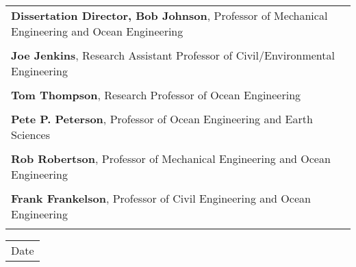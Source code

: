 \documentclass[12pt]{unhthesis}
\begin{document}
\vspace{12mm}
\begin{flushright}

\begin{singlespace}
\tabletail
   {\hline {}\\}
\tablelasttail{}
\begin{supertabular}{p{13cm}}
      \hline
         \textbf{Dissertation Director, Bob Johnson},
         \small{Professor of Mechanical Engineering and Ocean Engineering} \\
         \vspace{5mm} \\
      \hline
         \textbf{Joe Jenkins},
         \small{Research Assistant Professor of Civil/Environmental Engineering}
         \\
         \vspace{5mm}\\
      \hline
         \textbf{Tom Thompson},
         \small{Research Professor of Ocean Engineering} \\
         \vspace{5mm}\\
      \hline
         \textbf{Pete P. Peterson},
         \small{Professor of Ocean Engineering and Earth Sciences} \\
         \vspace{5mm}\\
      \hline
         \textbf{Rob Robertson},
         \small{Professor of Mechanical Engineering and Ocean Engineering} \\
         \vspace{5mm}\\
      \hline
         \textbf{Frank Frankelson},
         \small{Professor of Civil Engineering and Ocean Engineering} \\
         \vspace{12mm}\\
    \end{supertabular}

    \begin{tabular*}{2in}{l}
      \hline
        Date
    \end{tabular*}

\vspace{12mm}

\end{singlespace}
\end{flushright}
\end{document}
